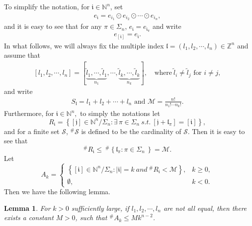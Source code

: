 \documentclass[11pt]{article}
\theoremstyle{plain}
\newtheorem{lem}[thm]{Lemma}
\theoremstyle{definition}
\begin{document}
To simplify the notation, for $\mathfrak{i}\in \mathbb N^n$, set 
\begin{eqnarray}
e_{\mathfrak{i}}=e_{i_{1} }\odot e_{i_{2} }\odot \cdots \odot e_{i_{n}}, 
\end{eqnarray}
and it is easy to see that for any $\pi\in\Sigma_n$, $e_{\mathfrak{i}}=e_{\mathfrak{i}_\pi}$ and write
\begin{eqnarray}
e_{[\mathfrak{i}]}=e_{\mathfrak{i}}.
\end{eqnarray}
In what follows, we will always fix the multiple index $\mathfrak{l}=(l_1,l_2,\cdots,l_n)\in \mathbb{Z}^n$ and assume that
\begin{eqnarray}\label{eq2.3}
[l_{1},  l_{2},\cdots,l_{n}]=[\underbrace{{\tilde{l}_{1}},\cdots,{\tilde{l}_{1}} }_{n_{1}} ,\cdots,\underbrace{{\tilde{l}_{k}},\cdots,{\tilde{l}_{k}} }_{n_{k}}] , \quad \mathrm{where} \ {\tilde{l}_{i}} \ne  {\tilde{l}_{j}} \text{ for }  i\not=j,
\end{eqnarray}
and write
\begin{eqnarray}
S_{\mathfrak{l}}=l_1+l_2+\cdots+l_n \text{ and }\mathscr{M}=\frac{n!}{n_{1}!\cdots n_{k}! }.
\end{eqnarray}
Furthermore, for  $\mathfrak{i}\in \mathbb{N}^{n},$
to simply the notations let
\begin{equation}\label{eq2}
R_{\mathfrak{i}}=\left\{[\mathfrak{j}]\in\mathbb N^n/\Sigma_n:  \exists \, \pi \in \Sigma_{n}~s.t.~  [\mathfrak{j}+\mathfrak{l}_\pi]=[\mathfrak{i}]\right\},
\end{equation}
and for a finite set $\mathcal{S}$,  $^{\# } \mathcal{S} $  is defined to be the cardinality of  $\mathcal{S}$. 
Then it is easy to see that
\begin{equation}\label{eq3}
	^{\#  }	R_{\mathfrak{i}  }  \le
	\ ^{\#  }	\left \{ \mathfrak{l}_\pi:\pi \in \Sigma_{n}\ \right \}   = \mathscr{M}.
\end{equation}
Let
\begin{equation}\label{eq311}
A_{k} = \begin{cases}
		\left \{ [\mathfrak{i}]\in \mathbb{N}^n/\Sigma_n: | \mathfrak{i}  |=k \ and \ ^{\#  }	R_{\mathfrak{i}  } <\mathscr{M}    \right \},& k \geq 0, \\
\emptyset,& k < 0.
	\end{cases}
	\end{equation}
Then we have the following lemma.
\begin{lem}\label{lemmas2.2}
    For $k>0$ sufficiently large, if $l_{1},  l_{2},\cdots,l_{n}$ are not all equal, then there exists a constant $M>0$, such that $^{\#  } A_{k} \le Mk^{n-2}$.
\end{lem}
\end{document}
